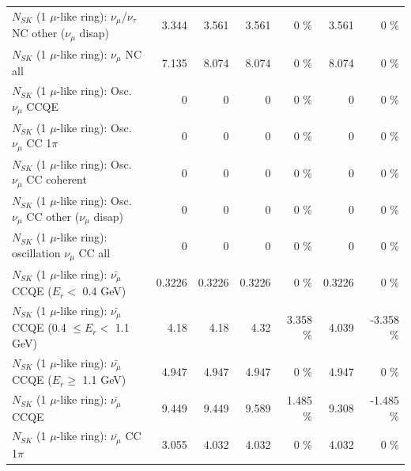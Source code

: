 \begin{table}
\begin{tabular}{| l | r | r | r  r | r  r |}
   $N_{SK}$ (1 $\mu$-like ring): $\nu_\mu$/$\nu_\tau$ NC other ($\nu_\mu$ disap) &           3.344 &           3.561 &           3.561 &        0 \%  &           3.561 &        0 \%  \\ 
                                $N_{SK}$ (1 $\mu$-like ring): $\nu_{\mu}$ NC all &           7.135 &           8.074 &           8.074 &        0 \%  &           8.074 &        0 \%  \\ 
\hline
\hline
                               $N_{SK}$ (1 $\mu$-like ring): Osc. $\nu_\mu$ CCQE &               0 &               0 &               0 &        0 \%  &               0 &        0 \%  \\ 
                          $N_{SK}$ (1 $\mu$-like ring): Osc. $\nu_\mu$ CC 1$\pi$ &               0 &               0 &               0 &        0 \%  &               0 &        0 \%  \\ 
                        $N_{SK}$ (1 $\mu$-like ring): Osc. $\nu_\mu$ CC coherent &               0 &               0 &               0 &        0 \%  &               0 &        0 \%  \\ 
         $N_{SK}$ (1 $\mu$-like ring): Osc. $\nu_\mu$ CC other ($\nu_\mu$ disap) &               0 &               0 &               0 &        0 \%  &               0 &        0 \%  \\ 
                      $N_{SK}$ (1 $\mu$-like ring): oscillation $\nu_\mu$ CC all &               0 &               0 &               0 &        0 \%  &               0 &        0 \%  \\ 
\hline
\hline
          $N_{SK}$ (1 $\mu$-like ring): $\bar{\nu_\mu}$ CCQE ($E_{r} <$ 0.4 GeV) &          0.3226 &          0.3226 &          0.3226 &        0 \%  &          0.3226 &        0 \%  \\ 
 $N_{SK}$ (1 $\mu$-like ring): $\bar{\nu_\mu}$ CCQE (0.4 $\leq E_{r} <$ 1.1 GeV) &            4.18 &            4.18 &            4.32 &    3.358 \%  &           4.039 &   -3.358 \%  \\ 
       $N_{SK}$ (1 $\mu$-like ring): $\bar{\nu_\mu}$ CCQE ($E_{r} \geq$ 1.1 GeV) &           4.947 &           4.947 &           4.947 &        0 \%  &           4.947 &        0 \%  \\ 
\hline
                              $N_{SK}$ (1 $\mu$-like ring): $\bar{\nu_\mu}$ CCQE &           9.449 &           9.449 &           9.589 &    1.485 \%  &           9.308 &   -1.485 \%  \\ 
                         $N_{SK}$ (1 $\mu$-like ring): $\bar{\nu_\mu}$ CC 1$\pi$ &           3.055 &           4.032 &           4.032 &        0 \%  &           4.032 &        0 \%  \\ 

\end{tabular}
\end{table}
